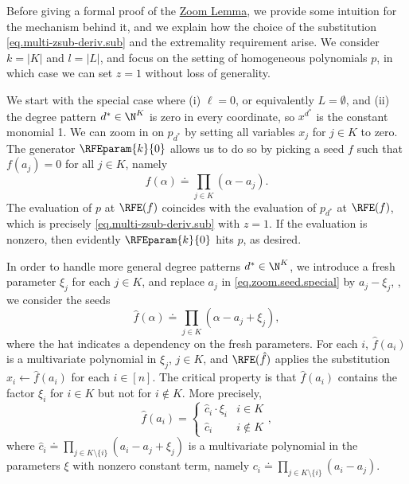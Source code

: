 Before giving a formal proof of the \hyperref[lem.multi-zsub-deriv]{Zoom Lemma},
we provide some intuition for the mechanism behind it,
and we explain how the choice of the substitution
\eqref{eq.multi-zsub-deriv.sub} and the extremality requirement arise. We consider $k=|K|$ and $l=|L|$, and focus on the setting of homogeneous polynomials $p$, in which case we can set $z=1$ without loss of generality. 

We start with the special case where (i) $\ell=0$,
or equivalently $L=\emptyset$,
and (ii) the degree pattern $d^* \in \N^K$ is zero in every coordinate,
so \(x^{d^*}\) is the constant monomial 1.
We can zoom in on $p_{d^*}$ by setting all variables $x_j$ for $j \in K$ to
zero.
The generator $\RFEparam{k}{0}$ allows us to do so by picking a seed $f$ such
that $f(a_j)=0$ for all $j \in K$, namely
\begin{equation}\label{eq.zoom.seed.special}
  f(\alpha) \doteq \prod_{j\in K}(\alpha - a_j).
\end{equation}
The evaluation of $p$ at $\RFE(f)$ coincides with the evaluation of $p_{d^*}$
at $\RFE(f)$,
which is precisely \eqref{eq.multi-zsub-deriv.sub} with $z=1$.
If the evaluation is nonzero,
then evidently $\RFEparam{k}{0}$ hits $p$, as desired.

In order to handle more general degree patterns $d^* \in \N^K$, 
we introduce a fresh parameter $\xi_j$ for each $j \in K$,
and replace $a_j$ in \eqref{eq.zoom.seed.special} by $a_j - \xi_j$,
\ie, we consider the seeds
\begin{equation}\label{eq.zoom.seed.K}
  \hat{f}(\alpha) \doteq \prod_{j \in K} (\alpha - a_j + \xi_j),
\end{equation}
where the hat indicates a dependency on the fresh parameters.
For each \(i\),
\(\hat{f}(a_i)\) is a multivariate polynomial in $\xi_j$, $j \in K$,
and \(\RFE(\hat{f})\) applies the substitution \(x_i \gets \hat{f}(a_i)\)
for each \(i \in [n]\).
The critical property is that $\hat{f}(a_i)$ contains the factor \(\xi_i\) for $i \in K$ but not for $i \not\in K$.
More precisely,
\begin{equation*}
  \hat{f}(a_i) = \begin{cases}
    \hat{c}_i\cdot \xi_i & i \in K \\
    \hat{c}_i & i \not\in K
  \end{cases},
\end{equation*}
where
$\hat{c}_i \doteq \prod_{j \in K\setminus\{i\}} (a_i - a_j + \xi_j)$
is a multivariate polynomial in the parameters $\xi$ with nonzero constant
term,
namely $c_i \doteq \prod_{j \in K\setminus\{i\}} (a_i - a_j)$.

